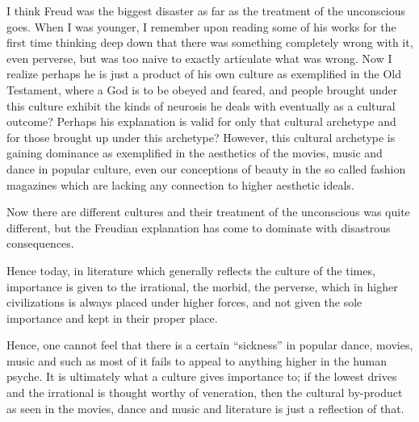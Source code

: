 \begin{footnotesize}
\begin{sffamily}
I think Freud was the biggest disaster as far as the treatment of the unconscious goes. When I was younger, I remember upon reading some of his works for the first time thinking deep down that there was something completely wrong with it, even perverse, but was too naive to exactly articulate what was wrong. Now I realize perhaps he is just a product of his own culture as exemplified in the Old Testament, where a God is to be obeyed and feared, and people brought under this culture exhibit the kinds of neurosis he deals with eventually as a cultural outcome? Perhaps his explanation is valid for only that cultural archetype and for those brought up under this archetype? However, this cultural archetype is gaining dominance as exemplified in the aesthetics of the movies, music and dance in popular culture, even our conceptions of beauty in the so called fashion magazines which are lacking any connection to higher aesthetic ideals.

Now there are different cultures and their treatment of the unconscious was quite different, but the Freudian explanation has come to dominate with disastrous consequences.

Hence today, in literature which generally reflects the culture of the times, importance is given to the irrational, the morbid, the perverse, which in higher civilizations is always placed under higher forces, and not given the sole importance and kept in their proper place.

Hence, one cannot feel that there is a certain ``sickness'' in popular dance, movies, music and such as most of it fails to appeal to anything higher in the human psyche. It is ultimately what a culture gives importance to; if the lowest drives and the irrational is thought worthy of veneration, then the cultural by-product as seen in the movies, dance and music and literature is just a reflection of that.

\end{sffamily}
\end{footnotesize}

